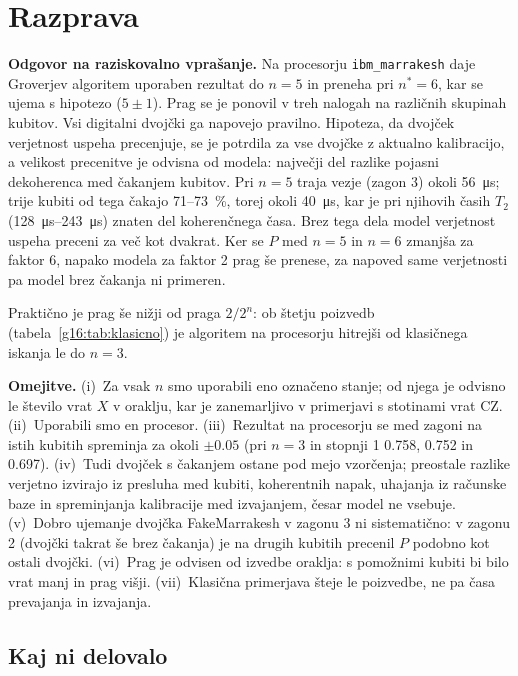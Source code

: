 \section{Razprava}
\label{g16:sec:razprava}

\textbf{Odgovor na raziskovalno vprašanje.} Na procesorju \texttt{ibm\_marrakesh} daje Groverjev algoritem uporaben rezultat do $n = 5$ in preneha pri $n^* = 6$, kar se ujema s hipotezo ($5 \pm 1$). Prag se je ponovil v treh nalogah na različnih skupinah kubitov. Vsi digitalni dvojčki ga napovejo pravilno. Hipoteza, da dvojček verjetnost uspeha precenjuje, se je potrdila za vse dvojčke z aktualno kalibracijo, a velikost precenitve je odvisna od modela: največji del razlike pojasni dekoherenca med čakanjem kubitov. Pri $n = 5$ traja vezje (zagon 3) okoli \SI{56}{\micro\second}; trije kubiti od tega čakajo 71--73~\%, torej okoli \SI{40}{\micro\second}, kar je pri njihovih časih $T_2$ (\SIrange{128}{243}{\micro\second}) znaten del koherenčnega časa. Brez tega dela model verjetnost uspeha preceni za več kot dvakrat. Ker se $P$ med $n = 5$ in $n = 6$ zmanjša za faktor 6, napako modela za faktor 2 prag še prenese, za napoved same verjetnosti pa model brez čakanja ni primeren.

Praktično je prag še nižji od praga $2/2^n$: ob štetju poizvedb (tabela~\ref{g16:tab:klasicno}) je algoritem na procesorju hitrejši od klasičnega iskanja le do $n = 3$.

\textbf{Omejitve.} (i)~Za vsak $n$ smo uporabili eno označeno stanje; od njega je odvisno le število vrat $X$ v oraklju, kar je zanemarljivo v primerjavi s stotinami vrat CZ. (ii)~Uporabili smo en procesor. (iii)~Rezultat na procesorju se med zagoni na istih kubitih spreminja za okoli $\pm\num{0,05}$ (pri $n = 3$ in stopnji 1 \num{0,758}, \num{0,752} in \num{0,697}). (iv)~Tudi dvojček s čakanjem ostane pod mejo vzorčenja; preostale razlike verjetno izvirajo iz presluha med kubiti, koherentnih napak, uhajanja iz računske baze in spreminjanja kalibracije med izvajanjem, česar model ne vsebuje. (v)~Dobro ujemanje dvojčka FakeMarrakesh v zagonu 3 ni sistematično: v zagonu 2 (dvojčki takrat še brez čakanja) je na drugih kubitih precenil $P$ podobno kot ostali dvojčki. (vi)~Prag je odvisen od izvedbe oraklja: s pomožnimi kubiti bi bilo vrat manj in prag višji. (vii)~Klasična primerjava šteje le poizvedbe, ne pa časa prevajanja in izvajanja.

\subsection{Kaj ni delovalo}
\label{g16:sec:neuspehi}

